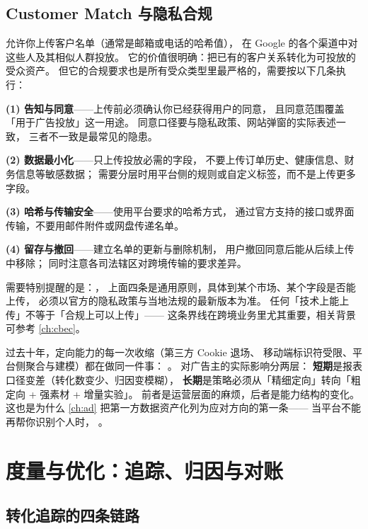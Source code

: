 \subsection{Customer Match 与隐私合规}

 允许你上传客户名单（通常是邮箱或电话的哈希值），
在 Google 的各个渠道中对这些人及其相似人群投放。
它的价值很明确：把已有的客户关系转化为可投放的受众资产。
但它的合规要求也是所有受众类型里最严格的，需要按以下几条执行：

\textbf{(1) 告知与同意}——上传前必须确认你已经获得用户的同意，
且同意范围覆盖「用于广告投放」这一用途。
同意口径要与隐私政策、网站弹窗的实际表述一致，
三者不一致是最常见的隐患。

\textbf{(2) 数据最小化}——只上传投放必需的字段，
不要上传订单历史、健康信息、财务信息等敏感数据；
需要分层时用平台侧的规则或自定义标签，而不是上传更多字段。

\textbf{(3) 哈希与传输安全}——使用平台要求的哈希方式，
通过官方支持的接口或界面传输，不要用邮件附件或网盘传递名单。

\textbf{(4) 留存与撤回}——建立名单的更新与删除机制，
用户撤回同意后能从后续上传中移除；
同时注意各司法辖区对跨境传输的要求差异。

需要特别提醒的是：，
上面四条是通用原则，具体到某个市场、某个字段是否能上传，
必须以官方的隐私政策与当地法规的最新版本为准。
任何「技术上能上传」不等于「合规上可以上传」——
这条界线在跨境业务里尤其重要，相关背景可参考 \cref{ch:cbec}。

\begin{insight}[定向能力的收缩是结构性的]
过去十年，定向能力的每一次收缩（第三方 Cookie 退场、
移动端标识符受限、平台侧聚合与建模）都在做同一件事：
。
对广告主的实际影响分两层：
\textbf{短期}是报表口径变差（转化数变少、归因变模糊），
\textbf{长期}是策略必须从「精细定向」转向「粗定向 + 强素材 + 增量实验」。
前者是运营层面的麻烦，后者是能力结构的变化。
这也是为什么 \cref{ch:ad} 把第一方数据资产化列为应对方向的第一条——
当平台不能再帮你识别个人时，
。
\end{insight}

\section{度量与优化：追踪、归因与对账}
\label{sec:g-measure}

\subsection{转化追踪的四条链路}

